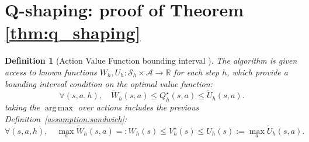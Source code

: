 \documentclass[twoside]{article}
\newtheorem{definition}{Definition}
\DeclareMathOperator*{\argmax}{arg\,max}
\newcommand{\lowq}{\widetilde{W}} %
\newcommand{\highq}{\widetilde{U}} %
\newcommand{\lowv}{W} %
\newcommand{\highv}{U} %
\newcommand{\sandwich}{bounding interval }
\begin{document}
\section{Q-shaping: proof of Theorem \ref{thm:q_shaping}}

\begin{definition}[Action Value Function \sandwich{}]
The algorithm is given access to known functions $\lowv_{h}, \highv_{h}: \mathcal{S}_h \times \mathcal{A} \to \mathbb{R}$ for each step $h$, which provide a \sandwich{} condition on the optimal value function:
\[
    \forall (s,a,h), \quad \lowq_h(s,a) \le Q_h^\star(s,a) \le \highq_h(s,a).
\]
taking the $\argmax$ over actions includes the previous Definition~\ref{assumption:sandwich}:
\[
    \forall (s,a,h), \quad \max_{a} \lowq_h(s,a) =: \lowv_{h}(s) \le V_h^\star(s) \le \highv_{h}(s) := \max_{a}\highq_h(s,a).
\]
\end{definition}
\end{document}
